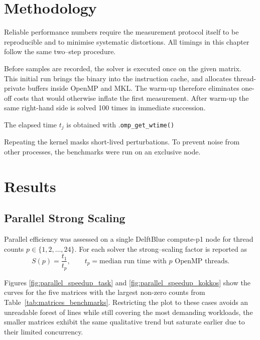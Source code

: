 \section{Methodology}\label{sec:res_methodology}
Reliable performance numbers require the measurement protocol itself to
be reproducible and to minimise systematic distortions.  All timings in
this chapter follow the same two–step procedure.

Before samples are recorded, the solver is executed once on the given
matrix.  This initial run brings the binary into the instruction cache, and allocates thread-private buffers inside OpenMP and MKL.  
The warm-up therefore eliminates one-off costs that would otherwise
inflate the first measurement.
After warm-up the same right-hand side is solved 100 times in immediate succession.

The elapsed time $t_j$ is obtained with .\texttt{omp\_get\_wtime()} 

Repeating the kernel masks short-lived perturbations. To prevent noise from other processes, the benchmarks were run on an exclusive node.

\section{Results}
\label{sec:res_results}

\subsection{Parallel Strong Scaling}
\label{sec:results_speedup}

Parallel efficiency was assessed on a single DelftBlue
compute-p1 node for thread counts
$p\in\{1,2,\dots,24\}$.
For each solver the strong–scaling factor is reported as
%
$$
  S(p)=\frac{t_{1}}{t_{p}}, \qquad
  t_{p}= \text{median run time with $p$ OpenMP threads}.
$$

Figures \ref{fig:parallel_speedup_task}
and \ref{fig:parallel_speedup_kokkos} show the curves for the five matrices with the largest non-zero counts
from Table~\ref{tab:matrices_benchmarks}.
Restricting the plot to these cases avoids an unreadable forest of
lines while still covering the most demanding workloads, the smaller
matrices exhibit the same qualitative trend but saturate earlier due
to their limited concurrency.

